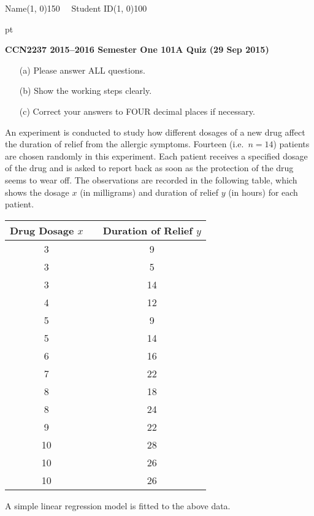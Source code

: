 \documentclass[12pt]{article}
\newenvironment{notes}{\noindent{\bf Notes }}{\vspace{0mm}}
\begin{document}
\begin{flushright}
Name\line(1, 0){150} \ \ Student ID\line(1, 0){100}
\end{flushright}

 pt

\begin{center}
{\bf \large CCN2237 2015--2016 Semester One 101A Quiz (29 Sep 2015)}
\end{center}

\vspace{0.3cm}

\begin{notes}
\begin{enumerate}
\item[{\sf (a)}]
{\sf Please answer ALL questions.}
\item[{\sf (b)}]
{\sf Show the working steps clearly.}
\item[{\sf (c)}]
{\sf Correct your answers to FOUR decimal places if necessary.}
\end{enumerate}
\end{notes}

\vspace{0.3cm}

\noindent An experiment is conducted to study how different dosages of a new drug affect the duration of relief from the allergic symptoms. Fourteen (i.e.~$n = 14$) patients are chosen randomly in this experiment. Each patient receives a specified dosage of the drug and is asked to report back as soon as the protection of the drug seems to wear off. The observations are recorded in the following table, which shows the dosage $x$ (in milligrams) and duration of relief $y$ (in hours) for each patient.
\begin{center}
\begin{tabular}{ccc}
{\sf Drug Dosage} $x$ & & {\sf Duration of Relief} $y$ \\ \hline
3 & & 9 \\
3 & & 5 \\
3 & & 14 \\
4 & & 12 \\
5 & & 9 \\
5 & & 14 \\
6 & & 16 \\
7 & & 22 \\
8 & & 18 \\
8 & & 24 \\
9 & & 22 \\
10 & & 28 \\
10 & & 26 \\
10 & & 26
\end{tabular}
\end{center}
A simple linear regression model is fitted to the above data.
\end{document}
